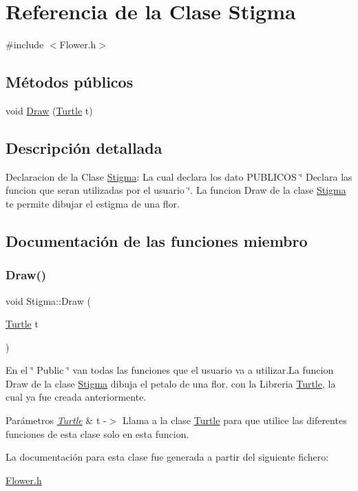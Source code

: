 \hypertarget{class_stigma}{}\section{Referencia de la Clase Stigma}
\label{class_stigma}


{\ttfamily \#include $<$Flower.\+h$>$}

\subsection*{Métodos públicos}
\begin{DoxyCompactItemize}
\item 
void \mbox{\hyperlink{class_stigma_a409d97b20b4798d431afc051cb160a9d}{Draw}} (\mbox{\hyperlink{class_turtle}{Turtle}} t)
\end{DoxyCompactItemize}


\subsection{Descripción detallada}
Declaracion de la Clase \mbox{\hyperlink{class_stigma}{Stigma}}\+: La cual declara los dato P\+U\+B\+L\+I\+C\+OS \char`\"{} Declara las funcion que seran utilizadas por el usuario \char`\"{}. La funcion Draw de la clase \mbox{\hyperlink{class_stigma}{Stigma}} te permite dibujar el estigma de una flor. 

\subsection{Documentación de las funciones miembro}
\mbox{\label{class_stigma_a409d97b20b4798d431afc051cb160a9d}} 
\subsubsection{\texorpdfstring{Draw()}{Draw()}}
{\footnotesize\ttfamily void Stigma\+::\+Draw (\begin{DoxyParamCaption}\item[{\mbox{\hyperlink{class_turtle}{Turtle}}}]{t }\end{DoxyParamCaption})\hspace{0.3cm}{\ttfamily [inline]}}

En el \char`\"{} Public \char`\"{} van todas las funciones que el usuario va a utilizar.\+La funcion Draw de la clase \mbox{\hyperlink{class_stigma}{Stigma}} dibuja el petalo de una flor. con la Libreria \mbox{\hyperlink{class_turtle}{Turtle}}, la cual ya fue creada anteriormente.
\begin{DoxyParams}{Parámetros}
{\em \mbox{\hyperlink{class_turtle}{Turtle}}} & t -\/$>$ Llama a la clase \mbox{\hyperlink{class_turtle}{Turtle}} para que utilice las diferentes funciones de esta clase solo en esta funcion. \\
\hline
\end{DoxyParams}


La documentación para esta clase fue generada a partir del siguiente fichero\+:\begin{DoxyCompactItemize}
\item 
\mbox{\hyperlink{_flower_8h}{Flower.\+h}}\end{DoxyCompactItemize}

